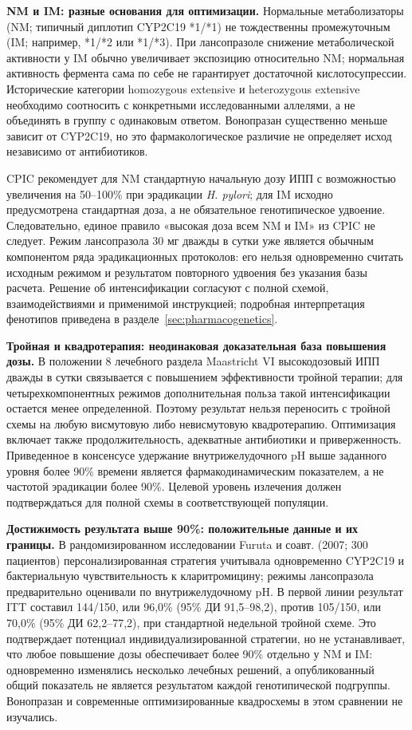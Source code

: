 \documentclass[11pt,a4paper,notitlepage]{report}
\newcommand{\Hp}{\textit{H. pylori}}
\newcommand{\src}[1]{\unskip\space\cite{#1}}
\begin{document}
\textbf{NM и IM: разные основания для оптимизации.} Нормальные метаболизаторы (NM; типичный диплотип CYP2C19 *1/*1) не тождественны промежуточным (IM; например, *1/*2 или *1/*3). При лансопразоле снижение метаболической активности у IM обычно увеличивает экспозицию относительно NM; нормальная активность фермента сама по себе не гарантирует достаточной кислотосупрессии. Исторические категории homozygous extensive и heterozygous extensive необходимо соотносить с конкретными исследованными аллелями, а не объединять в группу с одинаковым ответом. Вонопразан существенно меньше зависит от CYP2C19, но это фармакологическое различие не определяет исход независимо от антибиотиков.\src{cpic,jhp}

CPIC рекомендует для NM стандартную начальную дозу ИПП с возможностью увеличения на 50--100\% при эрадикации \Hp; для IM исходно предусмотрена стандартная доза, а не обязательное генотипическое удвоение. Следовательно, единое правило «высокая доза всем NM и IM» из CPIC не следует. Режим лансопразола 30 мг дважды в сутки уже является обычным компонентом ряда эрадикационных протоколов: его нельзя одновременно считать исходным режимом и результатом повторного удвоения без указания базы расчета. Решение об интенсификации согласуют с полной схемой, взаимодействиями и применимой инструкцией; подробная интерпретация фенотипов приведена в разделе~\ref{sec:pharmacogenetics}.\src{cpic,hpphalcon2022}

\textbf{Тройная и квадротерапия: неодинаковая доказательная база повышения дозы.} В положении 8 лечебного раздела Maastricht VI высокодозовый ИПП дважды в сутки связывается с повышением эффективности тройной терапии; для четырехкомпонентных режимов дополнительная польза такой интенсификации остается менее определенной. Поэтому результат нельзя переносить с тройной схемы на любую висмутовую либо невисмутовую квадротерапию. Оптимизация включает также продолжительность, адекватные антибиотики и приверженность. Приведенное в консенсусе удержание внутрижелудочного pH выше заданного уровня более 90\% времени является фармакодинамическим показателем, а не частотой эрадикации более 90\%. Целевой уровень излечения должен подтверждаться для полной схемы в соответствующей популяции.\src{maastricht}

\textbf{Достижимость результата выше 90\%: положительные данные и их границы.} В рандомизированном исследовании Furuta и соавт. (2007; 300 пациентов) персонализированная стратегия учитывала одновременно CYP2C19 и бактериальную чувствительность к кларитромицину; режимы лансопразола предварительно оценивали по внутрижелудочному pH. В первой линии результат ITT составил 144/150, или 96,0\% (95\% ДИ 91,5--98,2), против 105/150, или 70,0\% (95\% ДИ 62,2--77,2), при стандартной недельной тройной схеме. Это подтверждает потенциал индивидуализированной стратегии, но не устанавливает, что любое повышение дозы обеспечивает более 90\% отдельно у NM и IM: одновременно изменялись несколько лечебных решений, а опубликованный общий показатель не является результатом каждой генотипической подгруппы. Вонопразан и современные оптимизированные квадросхемы в этом сравнении не изучались.\src{hptailored2007}
\end{document}
